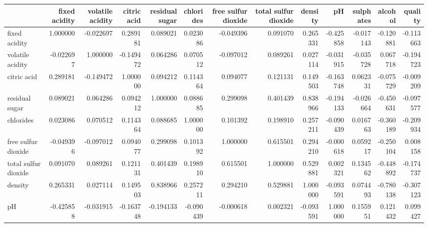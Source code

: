 \begin{tabular}{lrrrrrrrrrrrr}
\toprule
{} &  fixed acidity &  volatile acidity &  citric acid &  residual sugar &  chlorides &  free sulfur dioxide &  total sulfur dioxide &   density &        pH &  sulphates &   alcohol &   quality \\
\midrule
fixed acidity        &       1.000000 &         -0.022697 &     0.289181 &        0.089021 &   0.023086 &            -0.049396 &              0.091070 &  0.265331 & -0.425858 &  -0.017143 & -0.120881 & -0.113663 \\
volatile acidity     &      -0.022697 &          1.000000 &    -0.149472 &        0.064286 &   0.070512 &            -0.097012 &              0.089261 &  0.027114 & -0.031915 &  -0.035728 &  0.067718 & -0.194723 \\
citric acid          &       0.289181 &         -0.149472 &     1.000000 &        0.094212 &   0.114364 &             0.094077 &              0.121131 &  0.149503 & -0.163748 &   0.062331 & -0.075729 & -0.009209 \\
residual sugar       &       0.089021 &          0.064286 &     0.094212 &        1.000000 &   0.088685 &             0.299098 &              0.401439 &  0.838966 & -0.194133 &  -0.026664 & -0.450631 & -0.097577 \\
chlorides            &       0.023086 &          0.070512 &     0.114364 &        0.088685 &   1.000000 &             0.101392 &              0.198910 &  0.257211 & -0.090439 &   0.016763 & -0.360189 & -0.209934 \\
free sulfur dioxide  &      -0.049396 &         -0.097012 &     0.094077 &        0.299098 &   0.101392 &             1.000000 &              0.615501 &  0.294210 & -0.000618 &   0.059217 & -0.250104 &  0.008158 \\
total sulfur dioxide &       0.091070 &          0.089261 &     0.121131 &        0.401439 &   0.198910 &             0.615501 &              1.000000 &  0.529881 &  0.002321 &   0.134562 & -0.448892 & -0.174737 \\
density              &       0.265331 &          0.027114 &     0.149503 &        0.838966 &   0.257211 &             0.294210 &              0.529881 &  1.000000 & -0.093591 &   0.074493 & -0.780138 & -0.307123 \\
pH                   &      -0.425858 &         -0.031915 &    -0.163748 &       -0.194133 &  -0.090439 &            -0.000618 &              0.002321 & -0.093591 &  1.000000 &   0.155951 &  0.121432 &  0.099427 \\

\end{tabular}
